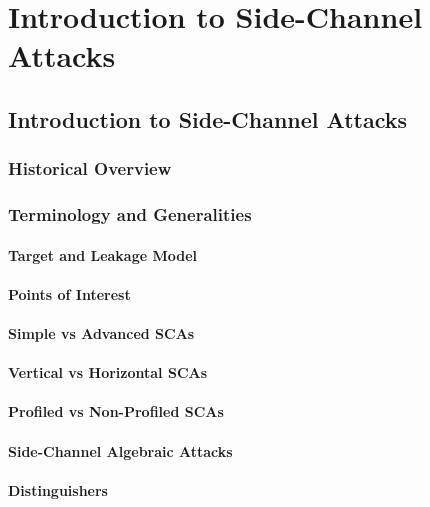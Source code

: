 \chapter{Introduction to Side-Channel Attacks} %

\label{ChapterIntroductionSCA}


\section{Introduction to Side-Channel Attacks}
\subsection{Historical Overview}

\subsection{Terminology and Generalities}
\subsubsection{Target and Leakage Model}


\subsubsection{Points of Interest}
\subsubsection{Simple vs Advanced SCAs}
\subsubsection{Vertical vs Horizontal SCAs}
\subsubsection{Profiled vs Non-Profiled SCAs}
\subsubsection{Side-Channel Algebraic Attacks}
\subsubsection{Distinguishers}
